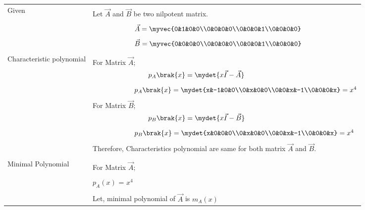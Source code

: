 \begin{longtable}{|p{5cm}|p{13cm}|}
    \hline
    \multirow{3}{*}{Given} 
    &\\
    & Let $\vec{A}$ and $\vec{B}$ be two nilpotent matrix.\\
    &\\
    &$\qquad\qquad\qquad \vec{A}=\myvec{0&1&0&0\\0&0&0&0\\0&0&0&1\\0&0&0&0}$\\
    &\\
    &$\qquad\qquad\qquad\vec{B}=\myvec{0&0&0&0\\0&0&0&0\\0&0&0&1\\0&0&0&0}$\\
    &\\
    \hline
	\multirow{3}{*}{Characteristic polynomial} 
	& \\
	& For Matrix $\vec{A}$;\\
	& $\qquad\qquad\qquad\qquad p_A\brak{x}=\mydet{x\Vec{I}-\Vec{A}}$\\
	&\\
	& $\qquad\qquad\qquad p_A\brak{x}=\mydet{x&-1&0&0\\0&x&0&0\\0&0&x&-1\\0&0&0&x} = x^4$\\
	&\\
	& For Matrix $\vec{B}$; \\
	& $\qquad\qquad\qquad\qquad p_B\brak{x}=\mydet{x\Vec{I}-\Vec{B}}$\\
	&\\
	& $\qquad\qquad\qquad p_B\brak{x}= \mydet{x&0&0&0\\0&x&0&0\\0&0&x&-1\\0&0&0&x} = x^4$\\
	&\\
	& Therefore, Characteristics polynomial are same for both matrix $\vec{A}$ and $\vec{B}$.\\
	&\\
	\hline
	\multirow{3}{*}{Minimal Polynomial} & \\
	& For Matrix $\vec{A}$;\\
	&\\
    & $p_A(x)$ = $x^4$ \\
    &\\
    & Let, minimal polynomial of $\vec{A}$ is $m_A(x)$\\

\end{longtable}
